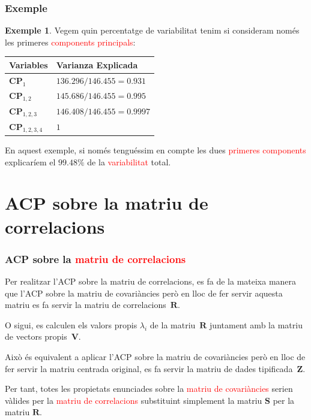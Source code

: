 \documentclass[12pt,t]{beamer}
\newcommand{\red}[1]{\textcolor{red}{#1}}
\theoremstyle{plain}
\theoremstyle{definition}
\newtheorem{exemple}{Exemple}
\begin{document}
\begin{frame}
\frametitle{Exemple}
\begin{exemple}
Vegem quin percentatge de variabilitat tenim si consideram només les primeres \red{components principals}:
\begin{center}
\begin{tabular}{|l|l|}\hline
Variables&Varianza Explicada\\\hline
$\mathbf{CP}_1$&$136.296/146.455=
0.931$\\\hline
$\mathbf{CP}_{1,2}$&$145.686/146.455=
0.995$\\\hline
$\mathbf{CP}_{1,2,3}$&$146.408/146.455=
0.9997$\\\hline
$\mathbf{CP}_{1,2,3,4}$&$1$\\\hline
\end{tabular}
\end{center}
En aquest exemple, si només tenguéssim en compte les dues \red{primeres components} explicaríem el 
$99.48\%$ de la \red{variabilitat} total.

\end{exemple}
\end{frame}

\section{ACP sobre la matriu de correlacions}
\begin{frame}
\frametitle{ACP sobre la \red{matriu de correlacions}}
Per realitzar l'ACP sobre la matriu de correlacions, es fa de la mateixa manera que l'ACP sobre la matriu de 
covariàncies però en lloc de fer servir aquesta matriu es fa servir la matriu de correlacions~$\mathbf{R}.$
\medskip

O sigui, es calculen els valors propis $\lambda_i$ de la matriu~$\mathbf{R}$ juntament amb la matriu de vectors 
propis~$\mathbf{V}$.
\medskip

Això és equivalent a aplicar l'ACP sobre la matriu de covariàncies però en lloc de fer servir la matriu centrada 
original, es fa servir la matriu de dades tipificada~$\mathbf{Z}.$
\medskip

Per tant, totes les propietats enunciades sobre la \red{matriu de covariàncies} serien vàlides per la \red{matriu de 
correlacions} substituint simplement la matriu $\mathbf{S}$ per la matriu $\mathbf{R}.$
\end{frame}
\end{document}
